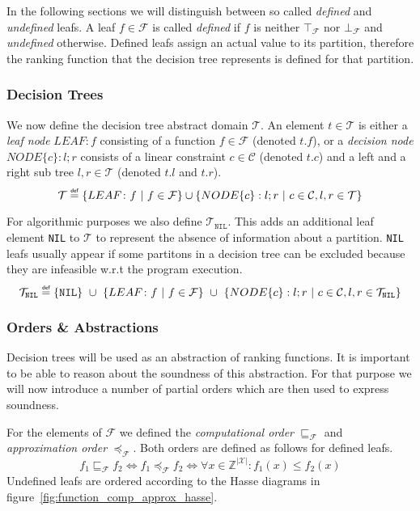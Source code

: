 \documentclass[11pt,a4paper,titlepage]{article}
\newcommand\eqdef{\mathrel{\overset{\makebox[0pt]{\mbox{\normalfont\tiny\sffamily def}}}{=}}}
\begin{document}
In the following sections we will distinguish between so called \textit{defined} and \textit{undefined} leafs. 
A leaf $f \in \mathcal{F}$ is called \textit{defined} if $f$ is neither $\top_{\mathcal{F}}$ nor $\bot_{\mathcal{F}}$  and \textit{undefined} otherwise.
Defined leafs assign an actual value to its partition, therefore the ranking function that the decision tree represents is defined for that partition.


\subsubsection*{Decision Trees}

We now define the decision tree abstract domain $\mathcal{T}$.
An element $t \in \mathcal{T}$ is either a \textit{leaf node} $LEAF \colon f$ consisting of a function $f \in \mathcal{F}$ (denoted $t.f$),
or a \textit{decision node} $NODE\{c\}: l; r$ consists of a linear constraint $c \in \mathcal{C}$ (denoted $t.c$) 
and a left and a right sub tree $l, r \in \mathcal{T}$ 
(denoted $t.l$ and $t.r$).
\[
    \mathcal{T} \eqdef \{LEAF \colon f \ | \ f \in \mathcal{F}\} \cup \{NODE\{c\}: l; r \ | \ c \in \mathcal{C}, l, r \in \mathcal{T} \} 
\]

For algorithmic purposes we also define $\mathcal{T}_{\mathtt{NIL}}$. 
This adds an additional leaf element \texttt{NIL} to $\mathcal{T}$ to represent the absence of information about a partition.
\texttt{NIL} leafs usually appear if some partitons in a decision tree can be excluded because they are infeasible w.r.t the program execution.
\[
    \mathcal{T}_{\mathtt{NIL}} \eqdef \{\mathtt{NIL}\} \ \cup \ \{LEAF \colon f \ | 
    \ f \in \mathcal{F}\} \ \cup \ \{NODE\{c\}: l; r \ | \ c \in \mathcal{C}, l, r \in \mathcal{T}_{\mathtt{NIL}}  \} 
\]


\subsubsection*{Orders \& Abstractions}

Decision trees will be used as an abstraction of ranking functions. It is important to be able to reason about the soundness of this abstraction.
For that purpose we will now introduce a number of partial orders which are then used to express soundness.

For the elements of $\mathcal{F}$ we defined the \textit{computational order} $\sqsubseteq_{\mathcal{F}}$ 
and \textit{approximation order} $\preceq_{\mathcal{F}}$. Both orders are defined as follows for defined leafs.
\[
    f_1 \sqsubseteq_{\mathcal{F}} f_2  \iff  f_1 \preceq_{\mathcal{F}} f_2 \iff
    \forall x \in \mathbb{Z}^{|\mathcal{X}|} \colon f_1(x) \leq f_2(x)
\]
Undefined leafs are ordered according to the Hasse diagrams in figure~\ref{fig:function_comp_approx_hasse}. \\\\
\end{document}
